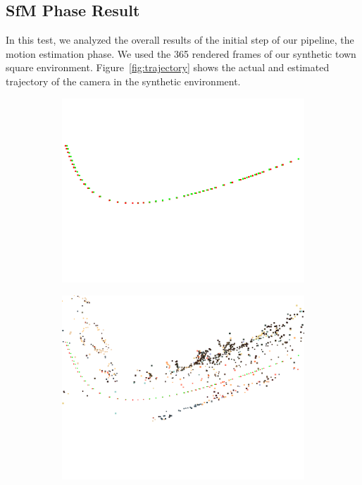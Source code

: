 \subsection{SfM Phase Result}
In this test, we analyzed the overall results of the initial step of our
pipeline, the motion estimation phase. We used the 365 rendered frames of our
synthetic town square environment. Figure~\ref{fig:trajectory} shows the actual
and estimated trajectory of the camera in the synthetic environment.
%
\begin{figure}[h]
\centering
\begin{subfigure}{0.45\linewidth}
\includegraphics[width=\linewidth]{img/snapshot00.png}
\label{fig:trajectory1}
\end{subfigure}
\begin{subfigure}{0.45\linewidth}
\includegraphics[width=\linewidth]{img/snapshot01.png}

\end{subfigure}
\end{figure}
